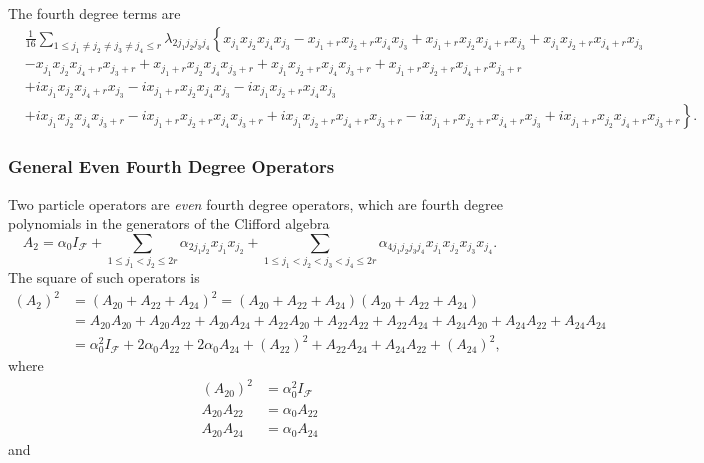 \documentclass[aps, preprint]{revtex4}
\begin{document}
The fourth degree terms are
\begin{align*} & \frac{1}{16} \sum _{1 \leq j_{1} \neq j_{2} \neq j_{3} \neq j_{4} \leq r}\lambda _{2 j_{1} j_{2} j_{3} j_{4}}\left \{x_{j_{1}} x_{j_{2}} x_{j_{4}} x_{j_{3}} -x_{j_{1} +r} x_{j_{2} +r} x_{j_{4}} x_{j_{3}} +x_{j_{1} +r} x_{j_{2}} x_{j_{4} +r} x_{j_{3}} +x_{j_{1}} x_{j_{2} +r} x_{j_{4} +r} x_{j_{3}}\right . \\
 &  -x_{j_{1}} x_{j_{2}} x_{j_{4} +r} x_{j_{3} +r} +x_{j_{1} +r} x_{j_{2}} x_{j_{4}} x_{j_{3} +r} +x_{j_{1}} x_{j_{2} +r} x_{j_{4}} x_{j_{3} +r} +x_{j_{1} +r} x_{j_{2} +r} x_{j_{4} +r} x_{j_{3} +r} \\
 &  +i x_{j_{1}} x_{j_{2}} x_{j_{4} +r} x_{j_{3}} -i x_{j_{1} +r} x_{j_{2}} x_{j_{4}} x_{j_{3}} -i x_{j_{1}} x_{j_{2} +r} x_{j_{4}} x_{j_{3}} \\
 &  +i x_{j_{1}} x_{j_{2}} x_{j_{4}} x_{j_{3} +r} -i x_{j_{1} +r} x_{j_{2} +r} x_{j_{4}} x_{j_{3} +r} +\left .i x_{j_{1}} x_{j_{2} +r} x_{j_{4} +r} x_{j_{3} +r} -i x_{j_{1} +r} x_{j_{2} +r} x_{j_{4} +r} x_{j_{3}} +i x_{j_{1} +r} x_{j_{2}} x_{j_{4} +r} x_{j_{3} +r}\right \}\text{.}\end{align*}

\subsubsection{General Even Fourth Degree Operators}
Two particle operators are \emph{even }fourth degree operators, which are fourth degree polynomials in the generators of the
Clifford algebra
\begin{equation}A_{2} =\alpha _{0} I_{\mathcal{F}} +\sum _{1 \leq j_{1} <j_{2} \leq 2 r}\alpha _{2 j_{1} j_{2}} x_{j_{1}} x_{j_{2}} +\sum _{1 \leq j_{1} <j_{2} <j_{3} <j_{4} \leq 2 r}\alpha _{4 j_{1} j_{2} j_{3} j_{4}} x_{j_{1}} x_{j_{2}} x_{j_{3}} x_{j_{4}}\text{.}
\end{equation}The square of such operators is
\begin{align}\left (A_{2}\right )^{2} &  =\left (A_{2 0} +A_{2 2} +A_{2 4}\right )^{2} =\left (A_{2 0} +A_{2 2} +A_{2 4}\right ) \left (A_{2 0} +A_{2 2} +A_{2 4}\right ) \nonumber  \\
 &  =A_{2 0} A_{2 0} +A_{2 0} A_{2 2} +A_{2 0} A_{2 4} +A_{2 2} A_{2 0} +A_{2 2} A_{2 2} +A_{2 2} A_{2 4} +A_{2 4} A_{2 0} +A_{2 4} A_{2 2} +A_{2 4} A_{2 4} \nonumber  \\
 &  =\alpha _{0}^{2} I_{\mathcal{F}} +2 \alpha _{0} A_{2 2} +2 \alpha _{0} A_{2 4} +\left (A_{2 2}\right )^{2} +A_{2 2} A_{2 4} +A_{2 4} A_{2 2} +\left (A_{2 4}\right )^{2}\text{,}\end{align}where
\begin{align}\left (A_{2 0}\right )^{2} &  =\alpha _{0}^{2} I_{\mathcal{F}} \\
A_{2 0} A_{2 2} &  =\alpha _{0} A_{2 2} \\
A_{2 0} A_{2 4} &  =\alpha _{0} A_{2 4}\end{align}and 
\end{document}
